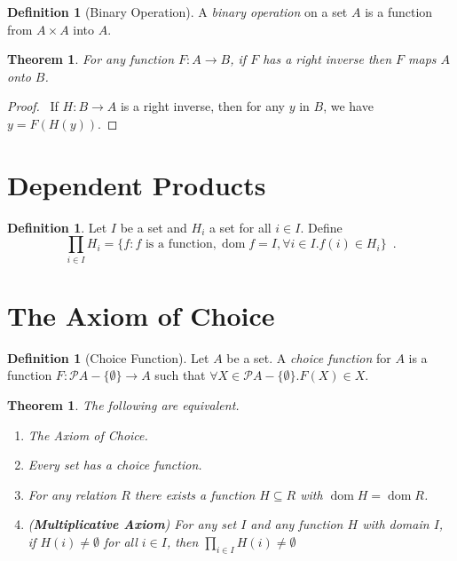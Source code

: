 \documentclass{report}
\let\qed\relax
\newtheorem{theorem}[axiom]{Theorem}
\theoremstyle{definition}
\newtheorem{definition}[axiom]{Definition}
\newcommand{\dom}{\ensuremath{\operatorname{dom}}}
\begin{document}
    \begin{definition}[Binary Operation]
        A \emph{binary operation} on a set $A$ is a function from $A \times A$ into $A$.
    \end{definition}

    \begin{theorem}
        For any function $F : A \rightarrow B$, if $F$ has a right inverse then $F$ maps $A$ onto $B$.
    \end{theorem}

    \begin{proof}
        \pf\ If $H : B \rightarrow A$ is a right inverse, then for any $y$ in $B$, we have
        $y = F(H(y))$. \qed
    \end{proof}

    \section{Dependent Products}

    \begin{definition}
        Let $I$ be a set and $H_i$ a set for all $i \in I$. Define
        \[ \prod_{i \in I} H_i = \{ f : \text{$f$ is a function}, \dom f = I, \forall i \in I. f(i) \in H_i \} \enspace . \]
    \end{definition}

    \section{The Axiom of Choice}

    \begin{definition}[Choice Function]
        Let $A$ be a set. A \emph{choice function} for $A$ is a function $F : \mathcal{P} A - \{ \emptyset \}
        \rightarrow A$ such that $\forall X \in \mathcal{P} A - \{ \emptyset \}. F(X) \in X$.
    \end{definition}

    \begin{theorem}
        The following are equivalent.
        \begin{enumerate}
            \item The Axiom of Choice.
            \item Every set has a choice function.
            \item 
            For any relation $R$ there exists a function $H \subseteq R$ with $\dom H = \dom R$.
            \item (\textbf{Multiplicative Axiom}) For any set $I$ and any function $H$ with domain
            $I$, if $H(i) \neq \emptyset$ for all $i \in I$, then $\prod_{i \in I} H(i) \neq \emptyset$
        \end{enumerate}
    \end{theorem}
\end{document}
